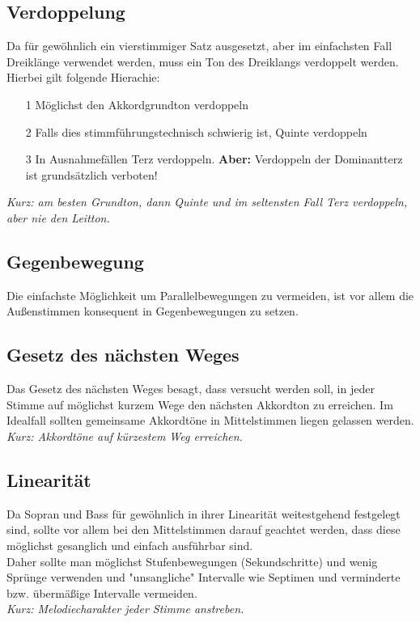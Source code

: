 \documentclass[a4paper]{article}
\begin{document}
	\subsection{Verdoppelung}
	Da für gewöhnlich ein vierstimmiger Satz ausgesetzt, aber im einfachsten Fall Dreiklänge verwendet werden, muss ein Ton des Dreiklangs verdoppelt werden. Hierbei gilt folgende Hierachie:
	\begin{enumerate}
		\item[1] Möglichst den Akkordgrundton verdoppeln
		\item[2] Falls dies stimmführungstechnisch schwierig ist, Quinte verdoppeln
		\item[3] In Ausnahmefällen Terz verdoppeln. \textbf{Aber:} Verdoppeln der Dominantterz ist grundsätzlich verboten!
	\end{enumerate}
	\textit{Kurz: am besten Grundton, dann Quinte und im seltensten Fall Terz verdoppeln, aber nie den Leitton.} 

	\subsection{Gegenbewegung}
	Die einfachste Möglichkeit um Parallelbewegungen zu vermeiden, ist vor allem die Außenstimmen konsequent in Gegenbewegungen zu setzen.
	
	\subsection{Gesetz des nächsten Weges}
	Das Gesetz des nächsten Weges besagt, dass versucht werden soll, in jeder Stimme auf möglichst kurzem Wege den nächsten Akkordton zu erreichen. Im Idealfall sollten gemeinsame Akkordtöne in Mittelstimmen liegen gelassen werden.\\
	\textit{Kurz: Akkordtöne auf kürzestem Weg erreichen.}
	
	\subsection{Linearität}
	Da Sopran und Bass für gewöhnlich in ihrer Linearität weitestgehend festgelegt sind, sollte vor allem bei den Mittelstimmen darauf geachtet werden, dass diese möglichst gesanglich und einfach ausführbar sind.\\
	Daher sollte man möglichst Stufenbewegungen (Sekundschritte) und wenig Sprünge verwenden und "unsangliche" Intervalle wie Septimen und verminderte bzw. übermäßige Intervalle vermeiden.\\
	\textit{Kurz: Melodiecharakter jeder Stimme anstreben.}
	
\end{document}
